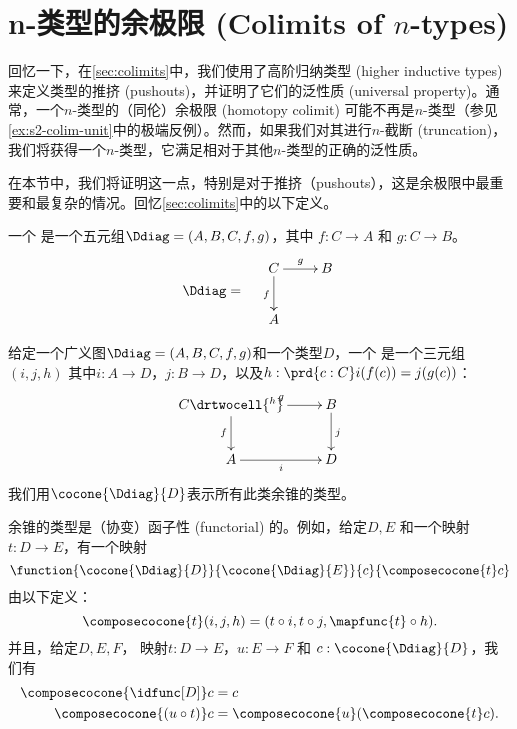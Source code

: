 \section{n-类型的余极限 (Colimits of \texorpdfstring{$n$}{n}-types)}
\label{sec:pushouts}

回忆一下，在\cref{sec:colimits}中，我们使用了高阶归纳类型 (higher inductive types) 来定义类型的推挤 (pushouts)，并证明了它们的泛性质 (universal property)。通常，一个$n$-类型的（同伦）余极限 (homotopy colimit) 可能不再是$n$-类型（参见\cref{ex:s2-colim-unit}中的极端反例）。然而，如果我们对其进行$n$-截断 (truncation)，我们将获得一个$n$-类型，它满足相对于其他$n$-类型的正确的泛性质。

在本节中，我们将证明这一点，特别是对于推挤（pushouts），这是余极限中最重要和最复杂的情况。回忆\cref{sec:colimits}中的以下定义。

\begin{defn}
    一个%
    是一个五元组$\Ddiag=(A,B,C,f,g)$，其中%
    $f:C\to{}A$ 和 $g:C\to{}B$。
    \[\Ddiag=\quad\vcenter{\xymatrix{C \ar^g[r] \ar_f[d] & B \\ A & }}\]
\end{defn}

\begin{defn}
    给定一个广义图$\Ddiag=(A,B,C,f,g)$和一个类型$D$，一个 是一个三元组$(i, j, h)$
    其中$i:A\to{}D$，$j:B\to{}D$，以及$h : \prd{c:C}i(f(c))=j(g(c))$：
    \[\uppercurveobject{{ }}\lowercurveobject{{ }}\twocellhead{{ }}
    \xymatrix{C \ar^g[r] \ar_f[d] \drtwocell{^h} & B \ar^j[d] \\ A \ar_i[r] & D
    }\]
    我们用$\cocone{\Ddiag}{D}$表示所有此类余锥的类型。
\end{defn}

余锥的类型是（协变）函子性 (functorial) 的。例如，给定$D,E$ %
和一个映射$t:D\to{}E$，有一个映射
\[\function{\cocone{\Ddiag}{D}}{\cocone{\Ddiag}{E}}{c}{\composecocone{t}c}\]
由以下定义：
\[\composecocone{t}(i,j,h)=(t\circ{}i,t\circ{}j,\mapfunc{t}\circ{}h).\]
并且，给定$D,E,F$， %
映射$t:D\to{}E$，$u:E\to{}F$ 和 $c:\cocone{\Ddiag}{D}$，我们有
\begin{align}
    \composecocone{\idfunc[D]}c &= c \label{eq:composeconeid}\\
    \composecocone{(u\circ{}t)}c&=\composecocone{u}(\composecocone{t}c). \label{eq:composeconefunc}
\end{align}


